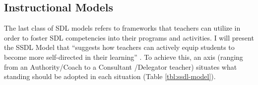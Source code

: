 
                

        


        


\subsection{Instructional Models}
\label{sdl-models-ss:instructional}

The last class of \gls{SDL} models refers to frameworks that teachers can utilize in order to foster \gls{SDL} competencies into their programs and activities. I will present the \gls{SSDL} Model that “suggests how teachers can actively equip students to become more self-directed in their learning” \cite[p.~126]{grow:1991}. To achieve this, an axis (ranging from an Authority/Coach to a Consultant /Delegator teacher) situates what standing should be adopted in each situation (Table \ref{tbl:ssdl-model}).

                

